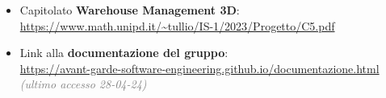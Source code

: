 \begin{itemize}
    \item Capitolato \textbf{Warehouse Management 3D}:\\
    \url{https://www.math.unipd.it/~tullio/IS-1/2023/Progetto/C5.pdf} 
    \item Link alla \textbf{documentazione del gruppo}:\\
    \url{https://avant-garde-software-engineering.github.io/documentazione.html} \textcolor{gray}{\textit{(ultimo accesso 28-04-24)}}
\end{itemize}